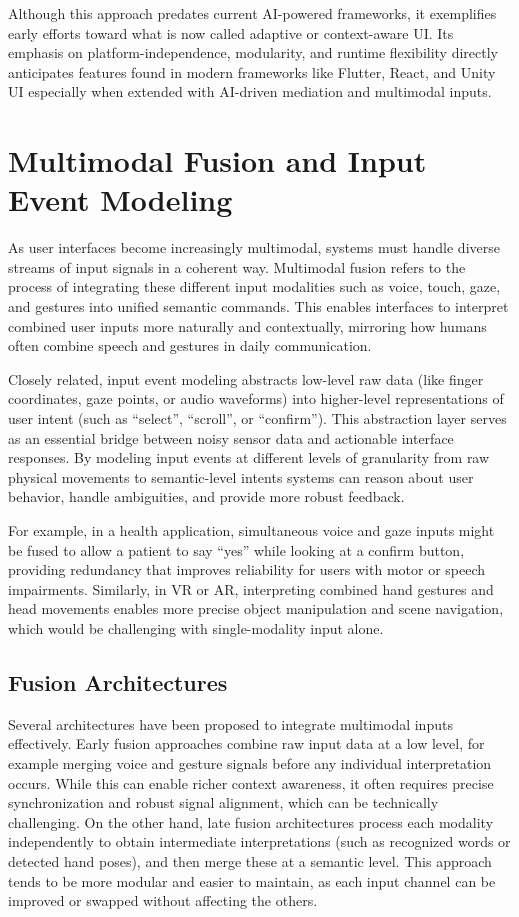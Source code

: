 \documentclass[openany]{book}
\begin{document}
Although this approach predates current AI-powered frameworks, it exemplifies early efforts toward what is now called adaptive or context-aware UI. Its emphasis on platform-independence, modularity, and runtime flexibility directly anticipates features found in modern frameworks like Flutter, React, and Unity UI especially when extended with AI-driven mediation and multimodal inputs.

\section{Multimodal Fusion and Input Event Modeling}
As user interfaces become increasingly multimodal, systems must handle diverse streams of input signals in a coherent way. Multimodal fusion refers to the process of integrating these different input modalities such as voice, touch, gaze, and gestures into unified semantic commands.  This enables interfaces to interpret combined user inputs more naturally and contextually, mirroring how humans often combine speech and gestures in daily communication.

Closely related, input event modeling abstracts low-level raw data (like finger coordinates, gaze points, or audio waveforms) into higher-level representations of user intent (such as “select”, “scroll”, or “confirm”). This abstraction layer serves as an essential bridge between noisy sensor data and actionable interface responses. By modeling input events at different levels of granularity from raw physical movements to semantic-level intents systems can reason about user behavior, handle ambiguities, and provide more robust feedback.

For example, in a health application, simultaneous voice and gaze inputs might be fused to allow a patient to say “yes” while looking at a confirm button, providing redundancy that improves reliability for users with motor or speech impairments. Similarly, in VR or AR, interpreting combined hand gestures and head movements enables more precise object manipulation and scene navigation, which would be challenging with single-modality input alone.

\subsection{Fusion Architectures}
Several architectures have been proposed to integrate multimodal inputs effectively. Early fusion approaches combine raw input data at a low level, for example merging voice and gesture signals before any individual interpretation occurs. While this can enable richer context awareness, it often requires precise synchronization and robust signal alignment, which can be technically challenging.
On the other hand, late fusion architectures process each modality independently to obtain intermediate interpretations (such as recognized words or detected hand poses), and then merge these at a semantic level. This approach tends to be more modular and easier to maintain, as each input channel can be improved or swapped without affecting the others.
\end{document}
